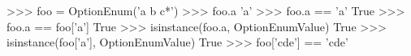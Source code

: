 \begin{python}
\begin{python}
    >>> foo = OptionEnum('a b c*')                                                                                                                                                                                                
    >>> foo.a                                                                                                                                                                                                                     
    'a'                                                                                                                                                                                                                           
    >>> foo.a == 'a'                                                                                                                                                                                                              
    True                                                                                                                                                                                                                          
    >>> foo.a == foo['a']                                                                                                                                                                                                         
    True                                                                                                                                                                                                                          
    >>> isinstance(foo.a, OptionEnumValue)                                                                                                                                                                                        
    True                                                                                                                                                                                                                          
    >>> isinstance(foo['a'], OptionEnumValue)                                                                                                                                                                                     
    True                                                                                                                                                                                                                          
    >>> foo['cde'] == 'cde'                                                                                                                                                                                                       

\end{python}
\end{python}
